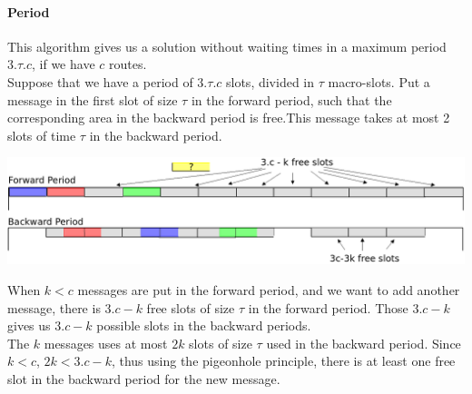 \documentclass[a4paper,10pt]{article}
\begin{document}
      \paragraph{Period}
	This algorithm gives us a solution without waiting times in a maximum period $3.\tau.c$, if we have $c$ routes.\\
	Suppose that we have a period of $3.\tau.c$ slots, divided in $\tau$ macro-slots. Put a message in the first slot of size $\tau$ in the forward period, such that the corresponding area in the backward period is free.This message takes at most 2 slots of time $\tau$ in the backward period.\\
      \begin{center}
      \includegraphics[scale=0.2]{ex3nt.png}
      \end{center}
	When $k < c$ messages are put in the forward period, and we want to add another message, there is $3.c - k$ free slots of size $\tau$ in the forward period. Those $3.c - k$ gives us $3.c - k$ possible slots in the backward periods.\\
	The $k$ messages uses at most $2k$ slots of size $\tau$ used in the backward period. Since $k<c$,  $2k < 3.c - k$, thus using the pigeonhole principle, there is at least one free slot in the backward period for the new message.
	
\end{document}
